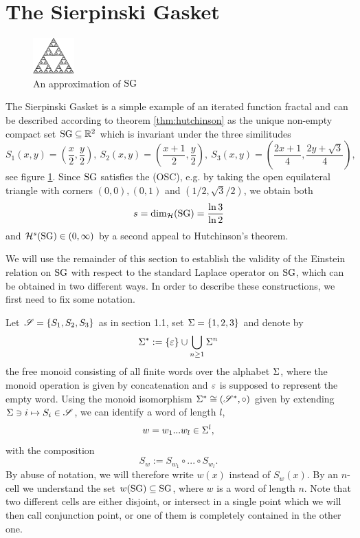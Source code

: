 \section{The Sierpinski Gasket}

\begin{figure}[h]
\centering
\includegraphics[scale=7]{sg.pdf}
\caption{An approximation of $\operatorname{SG}$}\label{fig:sg}
\end{figure}
The Sierpinski Gasket is a simple example of an iterated function fractal and can be described according to theorem \ref{thm:hutchinson} as the unique non-empty compact set $\operatorname{SG}\subseteq\mathbb{R}^2$ which is invariant under the three similitudes 
\[
  S_1(x,y)=\left(\frac{x}{2},\frac{y}{2}\right),\ 
  S_2(x,y)=\left(\frac{x+1}{2},\frac{y}{2}\right),\ 
  S_3(x,y)=\left(\frac{2x+1}{4},\frac{2y+\sqrt{3}}{4}\right),
\]
see figure \ref{fig:sg}. Since $\operatorname{SG}$ satisfies the (OSC), e.g. by taking the open equilateral triangle with corners $(0,0), (0,1)$ and $(1/2,\sqrt{3}/2)$, we obtain both 
\begin{equation}\label{eq:SGdimh}
  s=\dim_{\mathcal{H}}(\operatorname{SG})=\frac{\ln 3}{\ln 2}
\end{equation}
and $\mathcal{H}^s(\operatorname{SG})\in(0,\infty)$ by a second appeal to Hutchinson's theorem. 

We will use the remainder of this section to establish the validity of the Einstein relation on $\operatorname{SG}$ with respect to the standard Laplace operator on $\operatorname{SG}$, which can be obtained in two different ways. In order to describe these constructions, we first need to fix some notation. 

Let $\mathscr{S}=\{S_1,S_2,S_3\}$ as in section 1.1, set $\Sigma=\{1,2,3\}$ and denote by 
\[
  \Sigma^*:=\{\varepsilon\}\cup\bigcup_{n\geq 1}\Sigma^n
\]
the free monoid consisting of all finite words over the alphabet $\Sigma$, where the monoid operation is given by concatenation and $\varepsilon$ is supposed to represent the empty word. Using the monoid isomorphism 
$\Sigma^*\cong (\mathscr{S}^*,\circ)$ given by extending 
$\Sigma\ni i\mapsto S_i\in\mathscr{S}$, we can identify a word of length $l$,
\[
  w=w_1...w_l\in\Sigma^l,
\]
with the composition 
\[
  S_w:=S_{w_1}\circ...\circ S_{w_l}.
\]
By abuse of notation, we will therefore write $w(x)$ instead of $S_w(x)$. By an $n$-cell we understand the set $w(\operatorname{SG})\subseteq\operatorname{SG}$, where $w$ is a word of length $n$. Note that two different cells are either disjoint, or intersect in a single point which we will then call conjunction point, or one of them is completely contained in the other one. 

